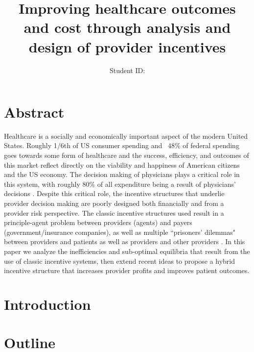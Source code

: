 \documentclass{article}
\title{\textbf{Improving healthcare outcomes and cost through analysis and design of provider incentives}}
\author{\studentname \qquad Student ID: \uwid}
\begin{document}
\maketitle

\section*{Abstract}

\paragraph{} Healthcare is a socially and economically important aspect of the modern United States. Roughly 1/6th of US consumer spending and ~48\% of federal \cite{federal_spend} spending goes towards some form of healthcare \cite{econharvard} and the success, efficiency, and outcomes of this market reflect directly on the viability and happiness of American citizens and the US economy. The decision making of physicians plays a critical role in this system, with roughly 80\% of all expenditure being a result of physicians' decisions \cite{trust}. Despite this critical role, the incentive structures that underlie provider decision making are poorly designed both financially and from a provider risk perspective. The classic incentive structures used result in a principle-agent problem between providers (agents) and payers (government/insurance companies), as well as multiple ``prisoners' dilemmas" between providers and patients as well as providers and other providers \cite{blended}. In this paper we analyze the inefficiencies and sub-optimal equilibria that result from the use of classic incentive systems, then extend recent ideas to propose a hybrid incentive structure that increases provider profits and improves patient outcomes.

\section*{Introduction}

\paragraph{}

\section*{Outline}
\end{document}

